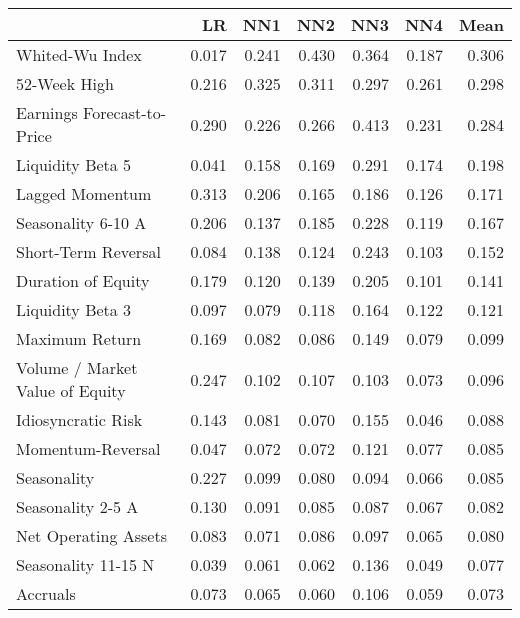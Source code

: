 \begin{tabular}{lrrrrrr}
\toprule
{} &     LR &    NN1 &    NN2 &    NN3 &    NN4 &   Mean \\
\midrule
Whited-Wu Index                            &  0.017 &  0.241 &  0.430 &  0.364 &  0.187 &  0.306 \\
52-Week High                               &  0.216 &  0.325 &  0.311 &  0.297 &  0.261 &  0.298 \\
Earnings Forecast-to-Price                 &  0.290 &  0.226 &  0.266 &  0.413 &  0.231 &  0.284 \\
Liquidity Beta 5                           &  0.041 &  0.158 &  0.169 &  0.291 &  0.174 &  0.198 \\
Lagged Momentum                            &  0.313 &  0.206 &  0.165 &  0.186 &  0.126 &  0.171 \\
Seasonality 6-10 A                         &  0.206 &  0.137 &  0.185 &  0.228 &  0.119 &  0.167 \\
Short-Term Reversal                        &  0.084 &  0.138 &  0.124 &  0.243 &  0.103 &  0.152 \\
Duration of Equity                         &  0.179 &  0.120 &  0.139 &  0.205 &  0.101 &  0.141 \\
Liquidity Beta 3                           &  0.097 &  0.079 &  0.118 &  0.164 &  0.122 &  0.121 \\
Maximum Return                             &  0.169 &  0.082 &  0.086 &  0.149 &  0.079 &  0.099 \\
Volume / Market Value of Equity            &  0.247 &  0.102 &  0.107 &  0.103 &  0.073 &  0.096 \\
Idiosyncratic Risk                         &  0.143 &  0.081 &  0.070 &  0.155 &  0.046 &  0.088 \\
Momentum-Reversal                          &  0.047 &  0.072 &  0.072 &  0.121 &  0.077 &  0.085 \\
Seasonality                                &  0.227 &  0.099 &  0.080 &  0.094 &  0.066 &  0.085 \\
Seasonality 2-5 A                          &  0.130 &  0.091 &  0.085 &  0.087 &  0.067 &  0.082 \\
Net Operating Assets                       &  0.083 &  0.071 &  0.086 &  0.097 &  0.065 &  0.080 \\
Seasonality 11-15 N                        &  0.039 &  0.061 &  0.062 &  0.136 &  0.049 &  0.077 \\
Accruals                                   &  0.073 &  0.065 &  0.060 &  0.106 &  0.059 &  0.073 \\

\end{tabular}
